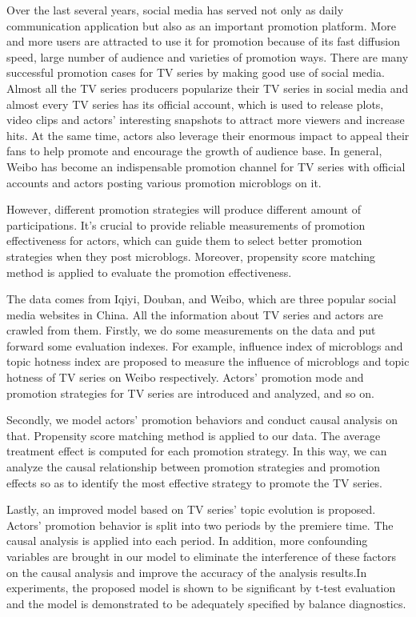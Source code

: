 
\begin{eabstract}

Over the last several years, social media has served not only as daily communication application but also as an important promotion platform. More and more users are attracted to use it for promotion because of its fast diffusion speed, large number of audience and varieties of promotion ways. There are many successful promotion cases for TV series by making good use of social media. Almost all the TV series producers popularize their TV series in social media and almost every TV series has its official account, which is used to release plots, video clips and actors’ interesting snapshots to attract more viewers and increase hits. At the same time, actors also leverage their enormous impact to appeal their fans to help promote and encourage the growth of audience base. In general, Weibo has become an indispensable promotion channel for TV series with official accounts and actors posting various promotion microblogs on it.

However, different promotion strategies will produce different amount of participations. It's crucial to provide reliable measurements of promotion effectiveness for actors, which can guide them to select better promotion strategies when they post microblogs. Moreover, propensity score matching method is applied to evaluate the promotion effectiveness. 

The data comes from Iqiyi, Douban, and Weibo, which are three popular social media websites in China. All the information about TV series and actors are crawled from them. Firstly, we do some measurements on the data and put forward some evaluation indexes. For example, influence index of microblogs and topic hotness index are proposed to measure the influence of microblogs and topic hotness of TV series on Weibo respectively. Actors' promotion mode and promotion strategies for TV series are introduced and analyzed, and so on.

Secondly, we model actors' promotion behaviors and conduct causal analysis on that. Propensity score matching method is applied to our data. The average treatment effect is computed for each promotion strategy. In this way, we can analyze the causal relationship between promotion strategies and promotion effects so as to identify the most effective strategy to promote the TV series.

Lastly, an improved model based on TV series' topic evolution is proposed. Actors' promotion behavior is split into two periods by the premiere time. The causal analysis is applied into each period. In addition, more confounding variables are brought in our model to eliminate the interference of these factors on the causal analysis and improve the accuracy of the analysis results.In experiments, the proposed model is shown to be significant by t-test evaluation and the model is demonstrated to be adequately specified by balance diagnostics. 

\end{eabstract}

